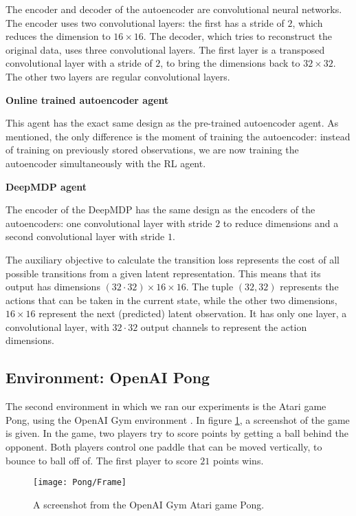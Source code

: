 The encoder and decoder of the autoencoder are convolutional neural networks. The encoder uses two convolutional layers: the first has a stride of $2$, which reduces the dimension to $16 \times 16$. The decoder, which tries to reconstruct the original data, uses three convolutional layers. The first layer is a transposed convolutional layer with a stride of $2$, to bring the dimensions back to $32 \times 32$. The other two layers are regular convolutional layers. \par
 
\noindent \textbf{Online trained autoencoder agent}\par
\noindent  This agent has the exact same design as the pre-trained autoencoder agent. As mentioned, the only difference is the moment of training the autoencoder: instead of training on previously stored observations, we are now training the autoencoder simultaneously with the RL agent. \par

\noindent \textbf{DeepMDP agent}\par
\noindent The encoder of the DeepMDP has the same design as the encoders of the autoencoders: one convolutional layer with stride $2$ to reduce dimensions and a second convolutional layer with stride $1$. 

The auxiliary objective to calculate the transition loss represents the cost of all possible transitions from a given latent representation. This means that its output has dimensions $(32 \cdot 32) \times 16 \times 16$. The tuple $(32, 32)$ represents the actions that can be taken in the current state, while the other two dimensions, $16 \times 16$ represent the next (predicted) latent observation. It has only one layer, a convolutional layer, with $32 \cdot 32$ output channels to represent the action dimensions.

\subsection{Environment: OpenAI Pong}\label{research-env-pong}
The second environment in which we ran our experiments is the Atari game Pong, using the OpenAI Gym environment \cite{pong}. In figure \ref{fig:pong-screen}, a screenshot of the game is given. In the game, two players try to score points by getting a ball behind the opponent. Both players control one paddle that can be moved vertically, to bounce to ball off of. The first player to score $21$ points wins.

\begin{figure}[h]
    \centering
    \texttt{[image: Pong/Frame]}
    \caption{A screenshot from the OpenAI Gym Atari game Pong.}
    \label{fig:pong-screen}
\end{figure}

